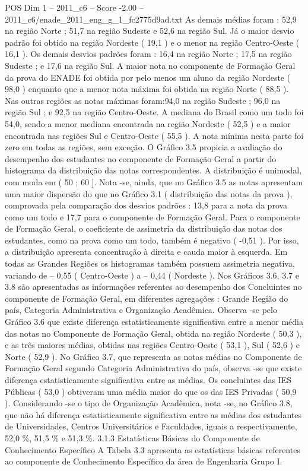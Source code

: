 \begin{textsample}{POS Dim 1 – 2011\_c6 – Score -2.00 – 2011\_c6/enade\_2011\_eng\_g\_1\_fc2775d9ad.txt}
As demais médias foram : 52,9 na região Norte ; 51,7 na região Sudeste e 52,6 na região Sul.
Já o maior desvio padrão foi obtido na região Nordeste ( 19,1 ) e o menor na região Centro-Oeste ( 16,1 ).
Os demais desvios padrões foram : 16,4 na região Norte ; 17,5 na região Sudeste ; e 17,6 na região Sul.
A maior nota no componente de Formação Geral da prova do ENADE foi obtida por pelo menos um aluno da região Nordeste ( 98,0 ) enquanto que a menor nota máxima foi obtida na região Norte ( 88,5 ).
Nas outras regiões as notas máximas foram:94,0 na região Sudeste ; 96,0 na região Sul ; e 92,5 na região Centro-Oeste.
A mediana do Brasil como um todo foi 54,0, sendo a menor mediana encontrada na região Nordeste ( 52,5 ) e a maior encontrada nas regiões Sul e Centro-Oeste ( 55,5 ).
A nota mínima nesta parte foi zero em todas as regiões, sem exceção.
O Gráfico 3.5 propicia a avaliação do desempenho dos estudantes no componente de Formação Geral a partir do histograma da distribuição das notas correspondentes.
A distribuição é unimodal, com moda em ( 50 ; 60 ].
Nota -se, ainda, que no Gráfico 3.5 as notas apresentam uma maior dispersão do que no Gráfico 3.1 ( distribuição das notas da prova ), comprovada pela comparação dos desvios padrões : 13,8 para a nota da prova como um todo e 17,7 para o componente de Formação Geral.
Para o componente de Formação Geral, o coeficiente de assimetria da distribuição das notas dos estudantes, como na prova como um todo, também é negativo ( -0,51 ).
Por isso, a distribuição apresenta concentração à direita e cauda maior à esquerda.
Em todas as Grandes Regiões os histogramas também possuem assimetria negativa, variando de – 0,55 ( Centro-Oeste ) a – 0,44 ( Nordeste ).
Nos Gráficos 3.6, 3.7 e 3.8 são apresentadas as informações referentes ao desempenho dos Concluintes no componente de Formação Geral, em diferentes agregações : Grande Região do país, Categoria Administrativa e Organização Acadêmica.
Observa -se pelo Gráfico 3.6 que existe diferença estatisticamente significativa entre a menor média das notas no Componente de Formação Geral, obtida na região Nordeste ( 50,3 ), e as três maiores médias, obtidas nas regiões Centro-Oeste ( 53,1 ), Sul ( 52,6 ) e Norte ( 52,9 ).
No Gráfico 3.7, que representa as notas médias no Componente de Formação Geral segundo Categoria Administrativa do país, observa -se que existe diferença estatisticamente significativa entre as médias.
Os concluintes das IES Públicas ( 53,0 ) obtiveram uma média maior do que os das IES Privadas ( 50,9 ).
Considerando -se o tipo de Organização Acadêmica, nota -se, no Gráfico 3.8, que não há diferença estatisticamente significativa entre as médias dos estudantes de Universidades, Centros Universitários e Faculdades, iguais a respectivamente, 52,0 \%, 51,5 \% e 51,3 \%. 3.1.3 Estatísticas Básicas do Componente de Conhecimento Específico A Tabela 3.3 apresenta as estatísticas básicas referentes ao componente de Conhecimento Específico da área de Engenharia Grupo I.

\end{textsample}
